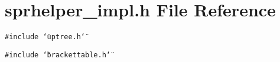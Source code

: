 \section{sprhelper\_\-impl.h File Reference}
\label{sprhelper__impl_8h}
{\tt \#include \char`\"{}uptree.h\char`\"{}}\par
{\tt \#include \char`\"{}brackettable.h\char`\"{}}\par
